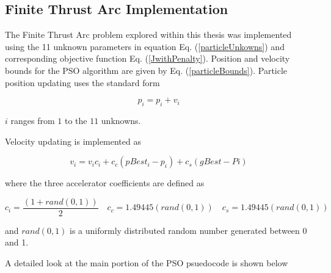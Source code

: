 \subsection{Finite Thrust Arc Implementation}

The Finite Thrust Arc problem explored within this thesis was implemented using the 11 unknown parameters in equation Eq. (\ref{particleUnkowns})
and corresponding objective function Eq. (\ref{JwithPenalty}). Position and velocity bounds for the PSO algorithm are given by Eq. (\ref{particleBounds}). Particle position updating uses 
the standard form

\begin{equation}
    \label{positionUpdating}
p_i = p_i+v_i
\end{equation}

\noindent $i$ ranges from $1$ to the $11$ unknowns. \newline

\noindent Velocity updating is implemented as

\begin{equation}
    \label{eq:velocityUpdating}
v_i = v_ic_i+c_c(pBest_i-p_i)+c_s(gBest-Pi)
\end{equation}

\noindent where the three accelerator coefficients are defined as

\begin{equation}
    \label{eq:acceleratorCoefficients}
c_i = \dfrac{(1+rand(0,1))}{2} \quad c_c = 1.49445(rand(0,1)) \quad c_s = 1.49445(rand(0,1))
\end{equation}

\noindent and $rand(0,1)$ is a uniformly distributed random number generated between 0 and 1. \newline

\noindent A detailed look at the main portion of the PSO psuedocode is shown below

